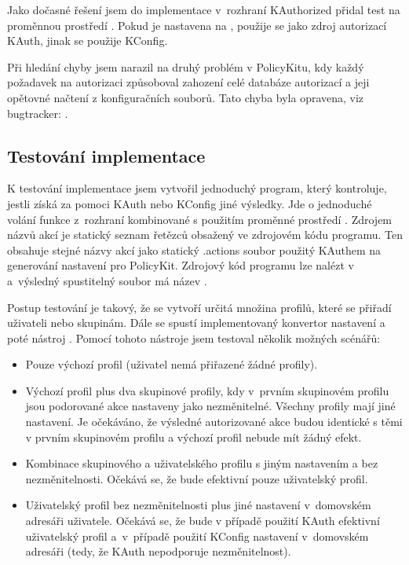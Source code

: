 Jako dočasné řešení jsem do implementace v~rozhraní KAuthorized přidal test na proměnnou prostředí . Pokud je nastavena na , použije se jako zdroj autorizací KAuth, jinak se použije KConfig.

Při hledání chyby jsem narazil na druhý problém v PolicyKitu, kdy každý požadavek na autorizaci způsoboval zahození celé databáze autorizací a jeji opětovné načtení z konfiguračních souborů. Tato chyba byla opravena, viz bugtracker: \cite{smallbugrep}.

\subsection*{Testování implementace}
K testování implementace jsem vytvořil jednoduchý program, který kontroluje, jestli získá za pomoci KAuth nebo KConfig jiné výsledky. Jde o jednoduché volání funkce  z~rozhraní  kombinované s použitím proměnné prostředí . Zdrojem názvů akcí je statický seznam řetězců obsažený ve zdrojovém kódu programu. Ten obsahuje stejné názvy akcí jako statický .actions soubor použitý KAuthem na generování nastavení pro PolicyKit. Zdrojový kód programu lze nalézt v~ a~výsledný spustitelný soubor má název .

Postup testování je takový, že se vytvoří určitá množina profilů, které se přiřadí uživateli nebo skupinám. Dále se spustí implementovaný konvertor nastavení  a poté nástroj . Pomocí tohoto nástroje jsem testoval několik možných scénářů:

\begin{itemize}
\item Pouze výchozí profil (uživatel nemá přiřazené žádné profily).
\item Výchozí profil plus dva skupinové profily, kdy v~prvním skupinovém profilu jsou podorované akce nastaveny jako nezměnitelné. Všechny profily mají jiné nastavení. Je očekáváno, že výsledné autorizované akce budou identické s těmi v prvním skupinovém profilu a výchozí profil nebude mít žádný efekt.
\item Kombinace skupinového a uživatelského profilu s jiným nastavením a bez nezměnitelnosti. Očekává se, že bude efektivní pouze uživatelský profil.
\item Uživatelský profil bez nezměnitelnosti plus jiné nastavení v~domovském adresáři uživatele. Očekává se, že bude v případě použití KAuth efektivní uživatelský profil a~v~případě použití KConfig nastavení v~domovském adresáři (tedy, že KAuth nepodporuje nezměnitelnost).
\end{itemize}

